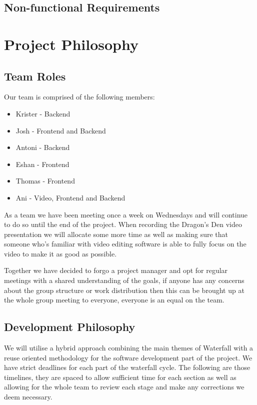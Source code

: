 \documentclass{article}
\begin{document}
\subsection{Non-functional Requirements}

\section{Project Philosophy}
\subsection{Team Roles}
Our team is comprised of the following members:

\begin{itemize}
  \item Krister - Backend 
  \item Josh - Frontend and Backend 
  \item Antoni - Backend 
  \item Eshan -  Frontend
  \item Thomas - Frontend
  \item Ani - Video, Frontend and Backend
\end{itemize}

As a team we have been meeting once a week on Wednesdays and will continue to do 
so until the end of the project. When recording the Dragon's Den video presentation 
we will allocate some more time as well as making sure that someone who's familiar 
with video editing software is able to fully focus on the video to make it as good
as possible. 

Together we have decided to forgo a project manager and opt for regular meetings 
with a shared understanding of the goals, if anyone has any concerns about the group 
structure or work distribution then this can be brought up at the whole group meeting 
to everyone, everyone is an equal on the team.

\subsection{Development Philosophy}
We will utilise a hybrid approach combining the main themes of Waterfall with a 
reuse oriented methodology for the software development part of the project. We 
have strict deadlines for each part of the waterfall cycle. The following are 
those timelines, they are spaced to allow sufficient time for each section as 
well as allowing for the whole team to review each stage and make any corrections 
we deem necessary. 
\end{document}
